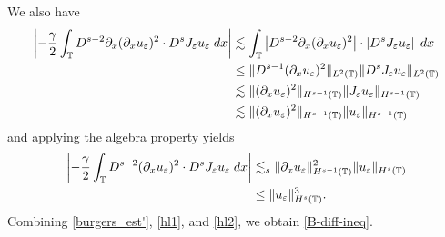%
%
We also have
\begin{equation}
\begin{split}
\left |- \frac{\gamma}{2} \int_{\mathbb{T}} D^{s-2} \partial_x (\partial_x u_\varepsilon)^2 \cdot
D^s J_\varepsilon u_\varepsilon \; dx \right |
& \lesssim  \int_{\mathbb{T}} \left | D^{s-2} \partial_x (\partial_x u_\varepsilon)^2 \right |
\cdot \left |D^s J_\varepsilon u_\varepsilon \right | \; dx
\\
& \le 
\| D^{s-1} (\partial_x u_\varepsilon)^2 \|_{L^2(\mathbb{T})}
\| D^s J_\varepsilon u_\varepsilon \|_{L^2(\mathbb{T})}
\\
& \lesssim \|(\partial_x u_\varepsilon)^2 \|_{H^{s-1}(\mathbb{T})}
\| J_\varepsilon u_\varepsilon \|_{H^{s-1}(\mathbb{T})} 
\\
& \lesssim \|(\partial_x u_\varepsilon)^2 \|_{H^{s-1}(\mathbb{T})} \| u_\varepsilon \|_{H^{s-1}(\mathbb{T})} 
\end{split}
\end{equation}
and applying the algebra property yields
\begin{equation}
\label{hl2}
\begin{split}
\left | - \frac{\gamma}{2} \int_{\mathbb{T}} D^{s-2} (\partial_x u_\varepsilon)^2 \cdot
D^s J_\varepsilon u_\varepsilon \; dx \right |
& \lesssim_{s} \| \partial_x u_\varepsilon \|_{H^{s-1}(\mathbb{T})}^2 \| u_\varepsilon \|_{H^s(\mathbb{T})} 
\\
& \le \|u_\varepsilon\|_{H^s(\mathbb{T})}^3.
\end{split}
\end{equation}
%
Combining \eqref{burgers_est'}, \eqref{hl1}, and \eqref{hl2}, we obtain
\eqref{B-diff-ineq}.
%  
% 
%
%
%   
%
\noindent
